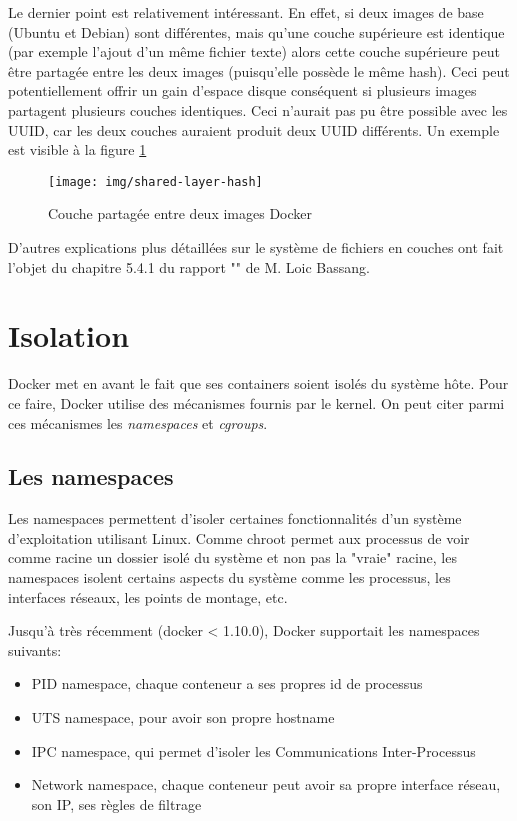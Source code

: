 Le dernier point est relativement intéressant. En effet, si deux images de base (Ubuntu et Debian) sont différentes, mais qu'une couche supérieure est identique (par exemple l'ajout d'un même fichier texte) alors cette couche supérieure peut être partagée entre les deux images (puisqu'elle possède le même hash). Ceci peut potentiellement offrir un gain d'espace disque conséquent si plusieurs images partagent plusieurs couches identiques. Ceci n'aurait pas pu être possible avec les UUID, car les deux couches auraient produit deux UUID différents. Un exemple est visible à la figure \ref{shared-layer-hash}

\begin{figure}[hbtp]
\centering
\texttt{[image: img/shared-layer-hash]}
\caption{Couche partagée entre deux images Docker}
\label{shared-layer-hash}
\end{figure}

D'autres explications plus détaillées sur le système de fichiers en couches ont fait l'objet du chapitre 5.4.1 du rapport "\bassangPrjSemestre" de M. Loic Bassang.


\section{Isolation}\label{pres-docker-isolation}
Docker met en avant le fait que ses containers soient isolés du système hôte. Pour ce faire, Docker utilise des mécanismes fournis par le kernel. On peut citer parmi ces mécanismes les \textit{namespaces} et \textit{cgroups}.

\subsection{Les namespaces}
Les namespaces permettent d'isoler certaines fonctionnalités d'un système d'exploitation utilisant Linux. Comme chroot permet aux processus de voir comme racine un dossier isolé du système et non pas la "vraie" racine, les namespaces isolent certains aspects du système comme les processus, les interfaces réseaux, les points de montage, etc.

Jusqu'à très récemment (docker < 1.10.0), Docker supportait les namespaces suivants\cite{docker_1_10_user_namespace}:

\begin{itemize}
\item PID namespace, chaque conteneur a ses propres id de processus
\item UTS namespace, pour avoir son propre hostname
\item IPC namespace, qui permet d'isoler les Communications Inter-Processus
\item Network namespace, chaque conteneur peut avoir sa propre interface réseau, son IP, ses règles de filtrage
\end{itemize}

